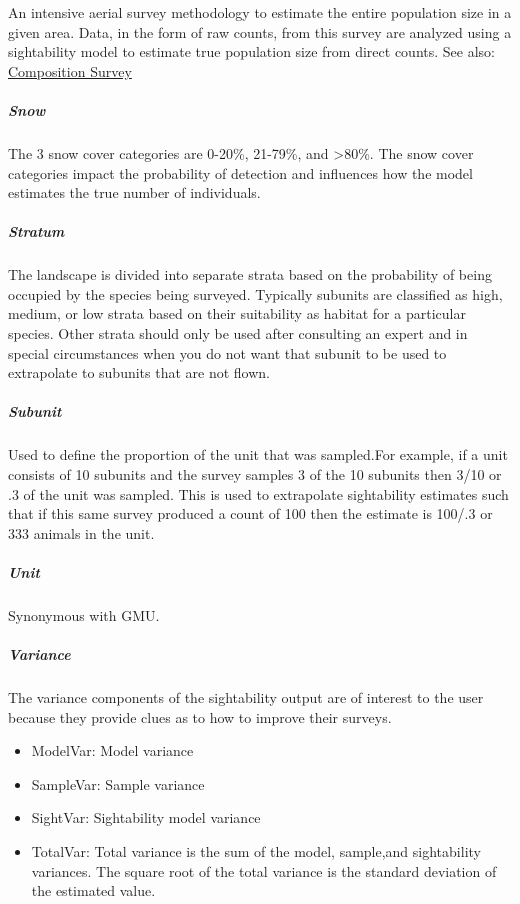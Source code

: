 \documentclass[
]{book}
\providecommand{\tightlist}{%
  \setlength{\itemsep}{0pt}\setlength{\parskip}{0pt}}
\begin{document}
An intensive aerial survey methodology to estimate the entire population size in a given area. Data, in the form of raw counts, from this survey are analyzed using a sightability model to estimate true population size from direct counts. See also: \protect\hyperlink{gl-comp-survey}{Composition Survey}

\hypertarget{gl-snow}{%
\subparagraph*{Snow}\label{gl-snow}}

The 3 snow cover categories are 0-20\%, 21-79\%, and \textgreater80\%. The snow cover categories impact the probability of detection and influences how the model estimates the true number of individuals.

\hypertarget{gl-stratum}{%
\subparagraph*{Stratum}\label{gl-stratum}}

The landscape is divided into separate strata based on the probability of being occupied by the species being surveyed. Typically subunits are classified as high, medium, or low strata based on their suitability as habitat for a particular species. Other strata should only be used after consulting an expert and in special circumstances when you do not want that subunit to be used to extrapolate to subunits that are not flown.

\hypertarget{gl-subunit}{%
\subparagraph*{Subunit}\label{gl-subunit}}

Used to define the proportion of the unit that was sampled.For example, if a unit consists of 10 subunits and the survey samples 3 of the 10 subunits then 3/10 or .3 of the unit was sampled. This is used to extrapolate sightability estimates such that if this same survey produced a count of 100 then the estimate is 100/.3 or 333 animals in the unit.

\hypertarget{gl-unit}{%
\subparagraph*{Unit}\label{gl-unit}}

Synonymous with GMU.

\hypertarget{gl-variance}{%
\subparagraph*{Variance}\label{gl-variance}}

The variance components of the sightability output are of interest to the user because they provide clues as to how to improve their surveys.

\begin{itemize}
\tightlist
\item
  ModelVar: Model variance
\item
  SampleVar: Sample variance
\item
  SightVar: Sightability model variance
\item
  TotalVar: Total variance is the sum of the model, sample,and sightability variances. The square root of the total variance is the standard deviation of the estimated value.
\end{itemize}
\end{document}
